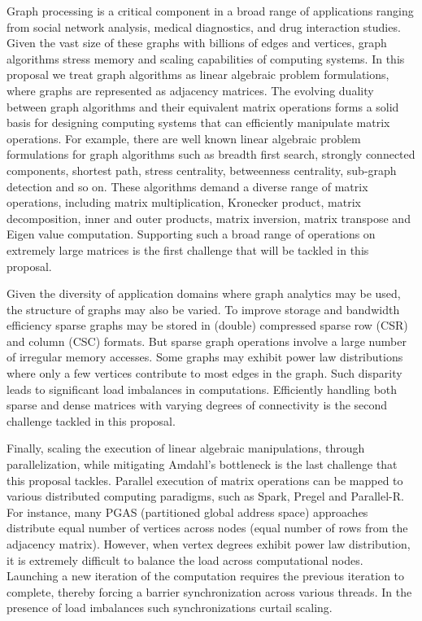 \noindent
Graph processing is a critical component in a broad range of applications ranging from social network analysis, medical diagnostics, and drug interaction studies.  
Given the vast size of these graphs with billions of edges and vertices, graph algorithms stress memory and scaling capabilities of computing systems. 
In this proposal we treat graph algorithms as linear algebraic problem formulations, where graphs are represented as adjacency matrices.  
The evolving duality between graph algorithms and their equivalent matrix operations forms a solid basis for designing computing systems that can efficiently manipulate matrix operations.  
For example, there are well known linear algebraic problem formulations for graph algorithms such as breadth first search, strongly connected components, shortest path, stress centrality, betweenness centrality, sub-graph detection and so on.  
These algorithms demand a diverse range of matrix operations, including matrix multiplication, Kronecker product,  matrix decomposition, inner and outer products, matrix inversion, matrix transpose and Eigen value computation.  
Supporting such a broad range of operations on extremely large matrices is the first challenge that will be tackled in this proposal. 


Given the diversity of application domains where graph analytics may be used, the structure of graphs may also be varied. 
To improve storage and bandwidth efficiency sparse graphs may be stored in  (double) compressed sparse row (CSR) and column (CSC) formats. 
But sparse graph operations involve a large number of irregular memory accesses.
Some graphs may exhibit power law distributions where only a few vertices contribute to most edges in the graph. 
Such disparity leads to significant load imbalances in computations.  
Efficiently handling both sparse and dense matrices with varying degrees of connectivity is the second challenge tackled in this proposal. 

 
Finally, scaling the execution of linear algebraic manipulations, through parallelization, while mitigating Amdahl's bottleneck is the last challenge that this proposal tackles. 
Parallel execution of matrix operations can be mapped to various distributed computing paradigms, such as Spark, Pregel and Parallel-R. 
For instance, many PGAS (partitioned global address space) approaches distribute equal number of vertices across nodes (equal number of rows from the adjacency matrix). 
However, when vertex degrees exhibit power law distribution, it is extremely difficult to balance the load across computational nodes. 
Launching a new iteration of the computation requires the previous iteration to complete, thereby forcing a barrier synchronization across various threads. 
In the presence of load imbalances such synchronizations curtail scaling. 


